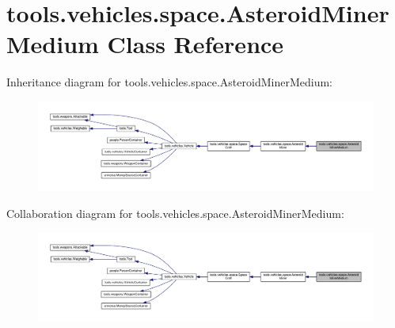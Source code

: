 \hypertarget{classtools_1_1vehicles_1_1space_1_1_asteroid_miner_medium}{}\section{tools.\+vehicles.\+space.\+Asteroid\+Miner\+Medium Class Reference}
\label{classtools_1_1vehicles_1_1space_1_1_asteroid_miner_medium}


Inheritance diagram for tools.\+vehicles.\+space.\+Asteroid\+Miner\+Medium\+:
\nopagebreak
\begin{figure}[H]
\begin{center}
\leavevmode
\includegraphics[width=350pt]{classtools_1_1vehicles_1_1space_1_1_asteroid_miner_medium__inherit__graph}
\end{center}
\end{figure}


Collaboration diagram for tools.\+vehicles.\+space.\+Asteroid\+Miner\+Medium\+:
\nopagebreak
\begin{figure}[H]
\begin{center}
\leavevmode
\includegraphics[width=350pt]{classtools_1_1vehicles_1_1space_1_1_asteroid_miner_medium__coll__graph}
\end{center}
\end{figure}
